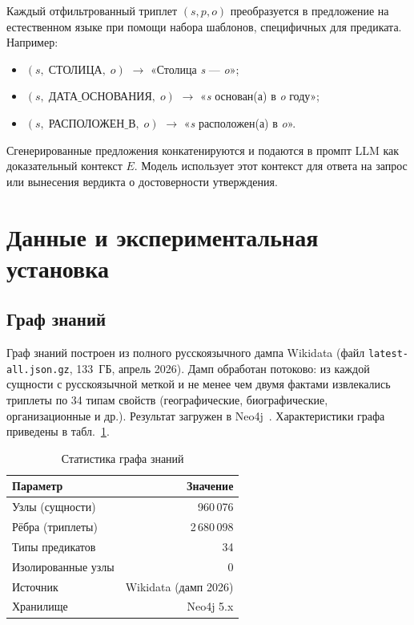 \documentclass{misisarticle}
\begin{document}
Каждый отфильтрованный триплет $(s, p, o)$
преобразуется в предложение на естественном языке
при помощи набора шаблонов, специфичных для предиката.
Например:
\begin{itemize}
  \item $(s,\;\texttt{СТОЛИЦА},\;o)$
    $\rightarrow$ «Столица \textit{s} — \textit{o}»;
  \item $(s,\;\texttt{ДАТА\_ОСНОВАНИЯ},\;o)$
    $\rightarrow$ «\textit{s} основан(а) в \textit{o} году»;
  \item $(s,\;\texttt{РАСПОЛОЖЕН\_В},\;o)$
    $\rightarrow$ «\textit{s} расположен(а) в \textit{o}».
\end{itemize}
Сгенерированные предложения конкатенируются
и подаются в промпт LLM как доказательный контекст $E$.
Модель использует этот контекст для ответа на запрос
или вынесения вердикта о достоверности утверждения.

\section{Данные и экспериментальная установка}

\subsection{Граф знаний}

Граф знаний построен из полного русскоязычного дампа Wikidata
(файл \texttt{latest-all.json.gz}, 133~ГБ, апрель 2026).
Дамп обработан потоково: из каждой сущности
с русскоязычной меткой и не менее чем двумя фактами
извлекались триплеты по 34 типам свойств
(географические, биографические, организационные и др.).
Результат загружен в Neo4j~\cite{neo4j2024}.
Характеристики графа приведены в табл.~\ref{tab:kg}.

\begin{table}[h]
\centering
\caption{Статистика графа знаний}\label{tab:kg}
\begin{tabular}{lr}
\hline
\textbf{Параметр} & \textbf{Значение} \\
\hline
Узлы (сущности)        & 960\,076  \\
Рёбра (триплеты)       & 2\,680\,098 \\
Типы предикатов        & 34       \\
Изолированные узлы     & 0        \\
Источник               & Wikidata (дамп 2026) \\
Хранилище              & Neo4j 5.x \\
\hline
\end{tabular}
\end{table}
\end{document}

